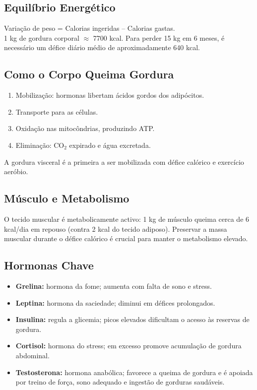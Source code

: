 \documentclass[12pt,a4paper]{scrartcl}
\begin{document}
\subsection{Equilíbrio Energético}
Variação de peso = Calorias ingeridas – Calorias gastas. \\
1 kg de gordura corporal $\approx$ 7700 kcal. Para perder 15 kg em 6 meses, é necessário um défice diário médio de aproximadamente 640 kcal.

\subsection{Como o Corpo Queima Gordura}
\begin{enumerate}
    \item Mobilização: hormonas libertam ácidos gordos dos adipócitos.
    \item Transporte para as células.
    \item Oxidação nas mitocôndrias, produzindo ATP.
    \item Eliminação: CO$_2$ expirado e água excretada.
\end{enumerate}
A gordura visceral é a primeira a ser mobilizada com défice calórico e exercício aeróbio.

\subsection{Músculo e Metabolismo}
O tecido muscular é metabolicamente activo: 1 kg de músculo queima cerca de 6 kcal/dia em repouso (contra 2 kcal do tecido adiposo). Preservar a massa muscular durante o défice calórico é crucial para manter o metabolismo elevado.

\subsection{Hormonas Chave}
\begin{itemize}
    \item \textbf{Grelina:} hormona da fome; aumenta com falta de sono e stress.
    \item \textbf{Leptina:} hormona da saciedade; diminui em défices prolongados.
    \item \textbf{Insulina:} regula a glicemia; picos elevados dificultam o acesso às reservas de gordura.
    \item \textbf{Cortisol:} hormona do stress; em excesso promove acumulação de gordura abdominal.
    \item \textbf{Testosterona:} hormona anabólica; favorece a queima de gordura e é apoiada por treino de força, sono adequado e ingestão de gorduras saudáveis.
\end{itemize}
\end{document}
